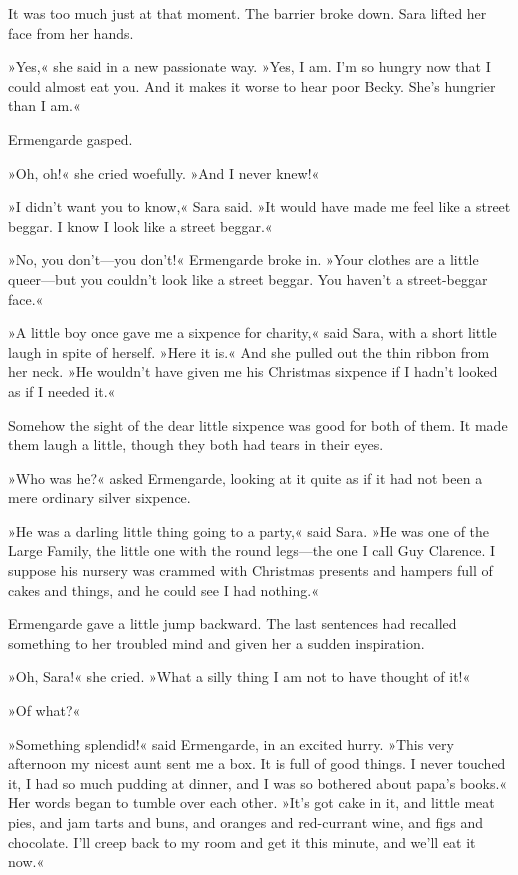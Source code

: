 It was too much just at that moment. The barrier broke down. Sara lifted her face from her hands.

»Yes,« she said in a new passionate way. »Yes, I am. I'm so hungry now that I could almost eat you. And it makes it worse to hear poor Becky. She's hungrier than I am.«

Ermengarde gasped.

»Oh, oh!« she cried woefully. »And I never knew!«

»I didn't want you to know,« Sara said. »It would have made me feel like a street beggar. I know I look like a street beggar.«

»No, you don't—you don't!« Ermengarde broke in. »Your clothes are a little queer—but you couldn't look like a street beggar. You haven't a street-beggar face.«

»A little boy once gave me a sixpence for charity,« said Sara, with a short little laugh in spite of herself. »Here it is.« And she pulled out the thin ribbon from her neck. »He wouldn't have given me his Christmas sixpence if I hadn't looked as if I needed it.«

Somehow the sight of the dear little sixpence was good for both of them. It made them laugh a little, though they both had tears in their eyes.

»Who was he?« asked Ermengarde, looking at it quite as if it had not been a mere ordinary silver sixpence.

»He was a darling little thing going to a party,« said Sara. »He was one of the Large Family, the little one with the round legs—the one I call Guy Clarence. I suppose his nursery was crammed with Christmas presents and hampers full of cakes and things, and he could see I had nothing.«

Ermengarde gave a little jump backward. The last sentences had recalled something to her troubled mind and given her a sudden inspiration.

»Oh, Sara!« she cried. »What a silly thing I am not to have thought of it!«

»Of what?«

»Something splendid!« said Ermengarde, in an excited hurry. »This very afternoon my nicest aunt sent me a box. It is full of good things. I never touched it, I had so much pudding at dinner, and I was so bothered about papa's books.« Her words began to tumble over each other. »It's got cake in it, and little meat pies, and jam tarts and buns, and oranges and red-currant wine, and figs and chocolate. I'll creep back to my room and get it this minute, and we'll eat it now.«

